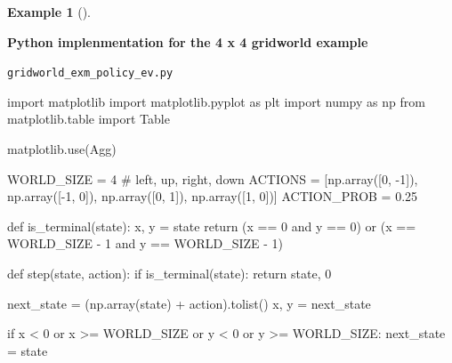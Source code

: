 \documentclass[
  letterpaper,
]{krantz}
\makeatletter
\newenvironment{Shaded}{\begin{snugshade}}{\end{snugshade}}
\newcommand{\CommentTok}[1]{\textcolor[rgb]{0.37,0.37,0.37}{#1}}
\newcommand{\ControlFlowTok}[1]{\textcolor[rgb]{0.00,0.23,0.31}{#1}}
\newcommand{\DecValTok}[1]{\textcolor[rgb]{0.68,0.00,0.00}{#1}}
\newcommand{\FloatTok}[1]{\textcolor[rgb]{0.68,0.00,0.00}{#1}}
\newcommand{\ImportTok}[1]{\textcolor[rgb]{0.00,0.46,0.62}{#1}}
\newcommand{\KeywordTok}[1]{\textcolor[rgb]{0.00,0.23,0.31}{#1}}
\newcommand{\NormalTok}[1]{\textcolor[rgb]{0.00,0.23,0.31}{#1}}
\newcommand{\OperatorTok}[1]{\textcolor[rgb]{0.37,0.37,0.37}{#1}}
\newcommand{\StringTok}[1]{\textcolor[rgb]{0.13,0.47,0.30}{#1}}
\newenvironment{kframe}{%
\medskip{}
\setlength{\fboxsep}{.8em}
 \def\at@end@of@kframe{}%
 \ifinner\ifhmode%
  \def\at@end@of@kframe{\end{minipage}}%
  \begin{minipage}{\columnwidth}%
 \fi\fi%
 \def\FrameCommand##1{\hskip\@totalleftmargin \hskip-\fboxsep
 \colorbox{shadecolor}{##1}\hskip-\fboxsep
     \hskip-\linewidth \hskip-\@totalleftmargin \hskip\columnwidth}%
 \MakeFramed {\advance\hsize-\width
   \@totalleftmargin\z@ \linewidth\hsize
   \@setminipage}}%
 {\par\unskip\endMakeFramed%
 \at@end@of@kframe}
\renewenvironment{Shaded}{\begin{kframe}}{\end{kframe}}
\theoremstyle{plain}
\theoremstyle{definition}
\newtheorem{example}{Example}[chapter]
\theoremstyle{definition}
\theoremstyle{remark}
\makeatother
\begin{document}
\begin{example}[]
\begin{tcolorbox}[enhanced jigsaw, bottomrule=.15mm, opacityback=0, breakable, colframe=quarto-callout-tip-color-frame, left=2mm, rightrule=.15mm, toprule=.15mm, leftrule=.75mm, arc=.35mm, colback=white]
\vspace{-3mm}\textbf{Python implenmentation for the 4 x 4 gridworld example}\vspace{3mm}

\begin{codelisting}[H]

\caption{\texttt{gridworld\_exm\_policy\_ev.py}}

\begin{Shaded}
\begin{Highlighting}[]
\ImportTok{import}\NormalTok{ matplotlib}
\ImportTok{import}\NormalTok{ matplotlib.pyplot }\ImportTok{as}\NormalTok{ plt}
\ImportTok{import}\NormalTok{ numpy }\ImportTok{as}\NormalTok{ np}
\ImportTok{from}\NormalTok{ matplotlib.table }\ImportTok{import}\NormalTok{ Table}

\NormalTok{matplotlib.use(}\StringTok{\textquotesingle{}Agg\textquotesingle{}}\NormalTok{)}

\NormalTok{WORLD\_SIZE }\OperatorTok{=} \DecValTok{4}
\CommentTok{\# left, up, right, down}
\NormalTok{ACTIONS }\OperatorTok{=}\NormalTok{ [np.array([}\DecValTok{0}\NormalTok{, }\OperatorTok{{-}}\DecValTok{1}\NormalTok{]),}
\NormalTok{           np.array([}\OperatorTok{{-}}\DecValTok{1}\NormalTok{, }\DecValTok{0}\NormalTok{]),}
\NormalTok{           np.array([}\DecValTok{0}\NormalTok{, }\DecValTok{1}\NormalTok{]),}
\NormalTok{           np.array([}\DecValTok{1}\NormalTok{, }\DecValTok{0}\NormalTok{])]}
\NormalTok{ACTION\_PROB }\OperatorTok{=} \FloatTok{0.25}


\KeywordTok{def}\NormalTok{ is\_terminal(state):}
\NormalTok{    x, y }\OperatorTok{=}\NormalTok{ state}
    \ControlFlowTok{return}\NormalTok{ (x }\OperatorTok{==} \DecValTok{0} \KeywordTok{and}\NormalTok{ y }\OperatorTok{==} \DecValTok{0}\NormalTok{) }\KeywordTok{or}\NormalTok{ (x }\OperatorTok{==}\NormalTok{ WORLD\_SIZE }\OperatorTok{{-}} \DecValTok{1} \KeywordTok{and}\NormalTok{ y }\OperatorTok{==}\NormalTok{ WORLD\_SIZE }\OperatorTok{{-}} \DecValTok{1}\NormalTok{)}


\KeywordTok{def}\NormalTok{ step(state, action):}
    \ControlFlowTok{if}\NormalTok{ is\_terminal(state):}
        \ControlFlowTok{return}\NormalTok{ state, }\DecValTok{0}

\NormalTok{    next\_state }\OperatorTok{=}\NormalTok{ (np.array(state) }\OperatorTok{+}\NormalTok{ action).tolist()}
\NormalTok{    x, y }\OperatorTok{=}\NormalTok{ next\_state}

    \ControlFlowTok{if}\NormalTok{ x }\OperatorTok{\textless{}} \DecValTok{0} \KeywordTok{or}\NormalTok{ x }\OperatorTok{\textgreater{}=}\NormalTok{ WORLD\_SIZE }\KeywordTok{or}\NormalTok{ y }\OperatorTok{\textless{}} \DecValTok{0} \KeywordTok{or}\NormalTok{ y }\OperatorTok{\textgreater{}=}\NormalTok{ WORLD\_SIZE:}
\NormalTok{        next\_state }\OperatorTok{=}\NormalTok{ state}


\end{Highlighting}
\end{Shaded}
\end{codelisting}
\end{tcolorbox}
\end{example}
\end{document}

